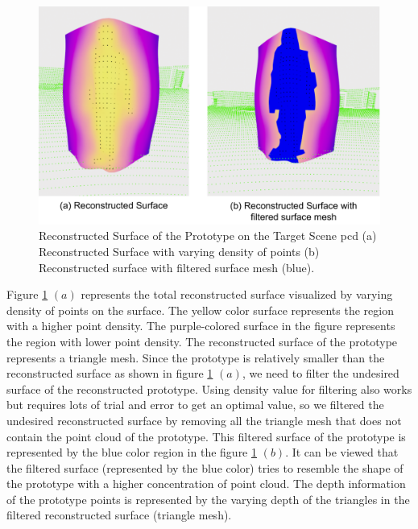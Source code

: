 \begin{figure}[htbp]
    \centering
    \includegraphics[width=1\linewidth]{97_graphics/results/surface_reconstruction.pdf}
    \caption[Reconstructed Surface of the Prototype on the Target Scene \acrshort{pcd}.]{Reconstructed Surface of the Prototype on the Target Scene \acrshort{pcd} (a) Reconstructed Surface with varying density of points (b) Reconstructed surface with filtered surface mesh (blue).}
    \label{fig:result-surface_reconstruction}
\end{figure}

Figure \ref{fig:result-surface_reconstruction} \((a)\) represents the total reconstructed surface visualized by varying density of points on the surface. The yellow color surface represents the region with a higher point density. The purple-colored surface in the figure represents the region with lower point density. The reconstructed surface of the prototype represents a triangle mesh. Since the prototype is relatively smaller than the reconstructed surface as shown in figure \ref{fig:result-surface_reconstruction} \((a)\), we need to filter the undesired surface of the reconstructed prototype. Using density value for filtering also works but requires lots of trial and error to get an optimal value, so we filtered the undesired reconstructed surface by removing all the triangle mesh that does not contain the point cloud of the prototype. This filtered surface of the prototype is represented by the blue color region in the figure \ref{fig:result-surface_reconstruction} \((b)\). It can be viewed that the filtered surface (represented by the blue color) tries to resemble the shape of the prototype with a higher concentration of point cloud. The depth information of the prototype points is represented by the varying depth of the triangles in the filtered reconstructed surface (triangle mesh).

